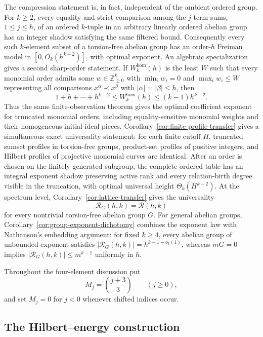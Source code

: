 \documentclass[11pt,reqno]{amsart}
\theoremstyle{definition}
\theoremstyle{remark}
\newcommand{\Rcal}{\mathcal R}
\begin{document}
The compression statement is, in fact, independent of the ambient ordered
group.  For $k\geq2$, every equality and strict comparison among the $j$-term sums,
$1\leq j\leq h$, of an ordered $k$-tuple in an arbitrary linearly ordered
abelian group has an integer shadow satisfying the same filtered bound.
Consequently every such $k$-element subset of a torsion-free abelian group has an
order-$h$ Freiman model in $[0,O_k(h^{k-2})]$, with optimal exponent.  An
algebraic specialization gives a second sharp-order statement.  If
$W_k^{\mathrm{hom}}(h)$ is the least $W$ such that every monomial order
admits some $w\in\mathbb Z_{\geq0}^k$ with $\min_iw_i=0$ and
$\max_iw_i\leq W$ representing all comparisons $x^\alpha\prec x^\beta$ with
$|\alpha|=|\beta|\leq h$, then
\begin{equation}\label{eq:monomial-weight-intro}
 1+h+\cdots+h^{k-2}
 \leq W_k^{\mathrm{hom}}(h)
 \leq(k-1)h^{k-2}.
\end{equation}
Thus the same finite-observation theorem gives the optimal coefficient
exponent for truncated monomial orders, including equality-sensitive
monomial weights and their homogeneous initial-ideal pieces.
Corollary~\ref{cor:finite-profile-transfer} gives a simultaneous exact
universality statement: for each finite cutoff $H$, truncated sumset profiles
in torsion-free groups, product-set profiles of positive integers, and Hilbert
profiles of projective monomial curves are identical.  After an order is
chosen on the finitely generated subgroup, the complete ordered table has an
integral exponent shadow preserving active rank and every relation-birth
degree visible in the truncation, with optimal universal height
$\Theta_k(H^{k-2})$.
At the spectrum level, Corollary~\ref{cor:lattice-transfer} gives the
universality
\[
 \Rcal_G(h,k)=\Rcal(h,k)
\]
for every nontrivial torsion-free abelian group $G$.
For general abelian groups, Corollary~\ref{cor:group-exponent-dichotomy}
combines the exponent law with Nathanson's embedding argument: for fixed
$k\geq4$, every abelian group of unbounded exponent satisfies
$|\Rcal_G(h,k)|=h^{k-1+o_k(1)}$, whereas $mG=0$ implies
$|\Rcal_G(h,k)|\leq m^{k-1}$ uniformly in $h$.

Throughout the four-element discussion put
\[
 M_j=\binom{j+3}{3}\qquad(j\geq0),
\]
 and set $M_j=0$ for $j<0$ whenever shifted indices occur.

\subsection*{The Hilbert--energy construction}
\end{document}
